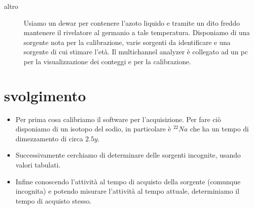 \documentclass[11pt,a4paper]{article}
\begin{document}
\begin{description}
  \item [altro] Usiamo un dewar per contenere l'azoto liquido e tramite un dito freddo mantenere il rivelatore al germanio a tale temperatura. Disponiamo di una sorgente nota per la calibrazione, varie sorgenti da identificare e una sorgente di cui stimare l'età. Il multichannel analyzer è collegato ad un pc per la visualizzazione dei conteggi e per la calibrazione.
\end{description}

\section{svolgimento}
\begin{itemize}
  \item Per prima cosa calibriamo il software per l'acquisizione. Per fare ciò disponiamo di un isotopo del sodio, in particolare è $^{22}Na$ che ha un tempo di dimezzamento di circa $2.5y$.
  \item Successivamente cerchiamo di determinare delle sorgenti incognite, usando valori tabulati.
  \item Infine conoscendo l'attività al tempo di acquisto della sorgente (comunque incognita) e potendo misurare l'attività al tempo attuale, determiniamo il tempo di acquisto stesso.
\end{itemize}
\end{document}

